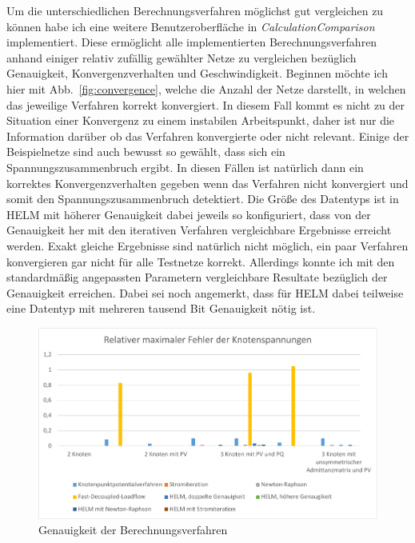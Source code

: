 \documentclass[12pt,a4paper]{article}
\newcommand{\reffig}[1]{{Abb.~\ref{#1}}}
\begin{document}
	Um die unterschiedlichen Berechnungsverfahren möglichst gut vergleichen zu können habe ich eine weitere Benutzeroberfläche in \emph{CalculationComparison} implementiert. Diese ermöglicht alle implementierten Berechnungsverfahren anhand einiger relativ zufällig gewählter Netze zu vergleichen bezüglich Genauigkeit, Konvergenzverhalten und Geschwindigkeit. Beginnen möchte ich hier mit \reffig{fig:convergence}, welche die Anzahl der Netze darstellt, in welchen das jeweilige Verfahren korrekt konvergiert. In diesem Fall kommt es nicht zu der Situation einer Konvergenz zu einem instabilen Arbeitspunkt, daher ist nur die Information darüber ob das Verfahren konvergierte oder nicht relevant. Einige der Beispielnetze sind auch bewusst so gewählt, dass sich ein Spannungszusammenbruch ergibt. In diesen Fällen ist natürlich dann ein korrektes Konvergenzverhalten gegeben wenn das Verfahren nicht konvergiert und somit den Spannungszusammenbruch detektiert. Die Größe des Datentyps ist in HELM mit höherer Genauigkeit dabei jeweils so konfiguriert, dass von der Genauigkeit her mit den iterativen Verfahren vergleichbare Ergebnisse erreicht werden. Exakt gleiche Ergebnisse sind natürlich nicht möglich, ein paar Verfahren konvergieren gar nicht für alle Testnetze korrekt. Allerdings konnte ich mit den standardmäßig angepassten Parametern vergleichbare Resultate bezüglich der Genauigkeit erreichen. Dabei sei noch angemerkt, dass für HELM dabei teilweise eine Datentyp mit mehreren tausend Bit Genauigkeit nötig ist.
	
	\begin{figure}
		\centering
		\includegraphics[scale=0.8]{pictures/precision_1}
		\caption{Genauigkeit der Berechnungsverfahren}
		\label{fig:precision_1}
	\end{figure}
	
\end{document}

